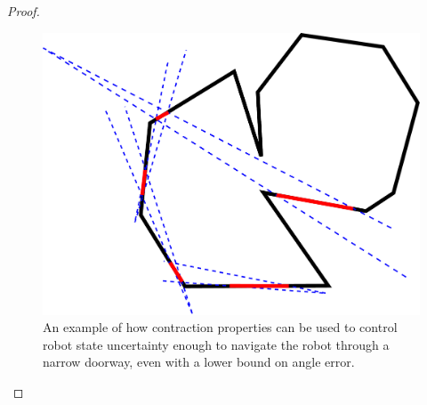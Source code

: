 \documentclass[]{styles/svproc}  %
\begin{document}
\begin{appendix}
\begin{proof}
\begin{figure}
    \includegraphics[width=0.6\linewidth]{figures/bounce_preimages.pdf}
    \centering
    \caption{An example of how contraction properties can be used to control
robot state uncertainty enough to navigate the robot through a narrow doorway,
even with a lower bound on angle error.}
\label{fig:preimage_example}
\end{figure}


\end{proof}

\end{appendix}
\end{document}
